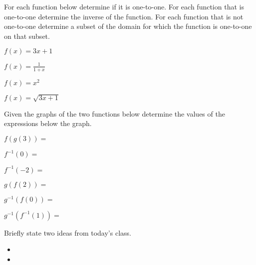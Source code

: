 \begin{problem}
\item For each function below determine if it is one-to-one. For each
  function that is one-to-one determine the inverse of the
  function. For each function that is not one-to-one determine a
  subset of the domain for which the function is one-to-one on that
  subset. 
  \begin{subproblem}
    \item $f(x)=3x+1$
      \vfill
    \item $f(x)=\frac{1}{1+x}$
      \vfill
    \item $f(x)=x^2$
      \vfill
    \item $f(x)=\sqrt{3x+1}$
      \vfill
  \end{subproblem}

  \clearpage

\item Given the graphs of the two functions below determine the values
  of the expressions below the graph.

  \scalebox{0.95}{}

  \begin{subproblem}
    \item $f(g(3)) =$
      \vfill
    \item $f^{-1}(0) =$
      \vfill
    \item $f^{-1}(-2) = $
      \vfill
    \item $g(f(2)) = $
      \vfill
    \item $g^{-1}(f(0)) = $
      \vfill
    \item $g^{-1}(f^{-1}(1)) = $
      \vfill
  \end{subproblem}

\end{problem}

\postClass

\begin{problem}
\item Briefly state two ideas from today's class.
  \begin{itemize}
  \item 
  \item 
  \end{itemize}
\item 
  \begin{subproblem}
    \item
  \end{subproblem}
\end{problem}



